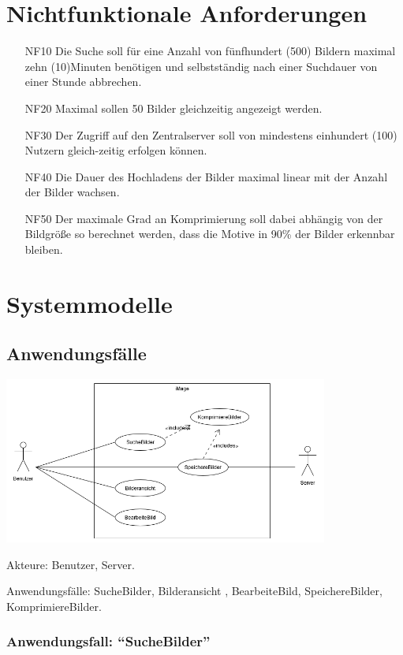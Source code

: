 \documentclass[parskip=full]{scrartcl}
\begin{document}
\section{Nichtfunktionale Anforderungen}
\begin{itemize}[nosep]
\item[NF10] Die Suche soll für eine Anzahl von fünfhundert (500) Bildern maximal zehn (10)Minuten benötigen und selbstständig nach einer Suchdauer von einer Stunde abbrechen.
\item[NF20] Maximal sollen 50  Bilder  gleichzeitig  angezeigt  werden.
\item[NF30] Der Zugriff auf den Zentralserver soll von mindestens einhundert (100) Nutzern gleich-zeitig erfolgen können.
\item[NF40] Die Dauer des Hochladens der Bilder maximal linear mit der Anzahl der Bilder wachsen.
\item[NF50] Der maximale Grad an \gls{Komprimierung} soll dabei abhängig von der Bildgröße so berechnet werden, dass die Motive in 90\% der Bilder erkennbar bleiben.
\end{itemize}

\section{Systemmodelle}

\subsection{Anwendungsfälle}
\begin{center}
\includegraphics[width=0.8\textwidth]{iMage_Anwendungsfalldiagramm.png}
\end{center}

Akteure: Benutzer, Server.

Anwendungsfälle: SucheBilder, Bilderansicht , BearbeiteBild, SpeichereBilder, KomprimiereBilder.

\subsubsection{Anwendungsfall: "`SucheBilder"'}
\end{document}

